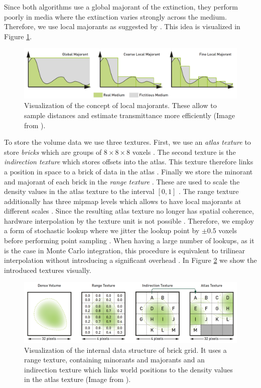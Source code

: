 Since both algorithms use a global majorant of the extinction, they perform poorly in media where the extinction varies strongly across the medium.
Therefore, we use local majorants as suggested by \citeauthor{brick_grid} \cite{brick_grid}.
This idea is visualized in Figure \ref{fig:brick_grid_majorants}.
\begin{figure}[ht]
    \centering
    \includegraphics[width=0.9\linewidth]{img/brick_grid_majorants.png}
    \caption[Visualization of local density majorants]{Visualization of the concept of local majorants. These allow to sample distances and estimate transmittance more efficiently (Image from \cite{brick_grid}).}
    \label{fig:brick_grid_majorants}
\end{figure}
To store the volume data we use three textures.
First, we use an \textit{atlas texture} to store \textit{bricks} which are groups of $8 \times 8 \times 8$ voxels \cite{brick_grid}.
The second texture is the \textit{indirection texture} which stores offsets into the atlas.
This texture therefore links a position in space to a brick of data in the atlas \cite{brick_grid}.
Finally we store the minorant and majorant of each brick in the \textit{range texture} \cite{brick_grid}.
These are used to scale the density values in the atlas texture to the interval $[0, 1]$ \cite{brick_grid}.
The range texture additionally has three mipmap levels which allows to have local majorants at different scales \cite{brick_grid}.
Since the resulting atlas texture no longer has spatial coherence, hardware interpolation by the texture unit is not possible \cite{brick_grid}.
Therefore, we employ a form of stochastic lookup where we jitter the lookup point by $\pm0.5$ voxels before performing point sampling \cite{brick_grid}.
When having a large number of lookups, as it is the case in Monte Carlo integration, this procedure is equivalent to trilinear interpolation without introducing a significant overhead \cite{brick_grid}.
In Figure \ref{fig:brick_grid_datastructure} we show the introduced textures visually.
\begin{figure}[ht]
    \centering
    \includegraphics[width=0.9\linewidth]{img/brick_grid_datastructure.png}
    \caption[Data structure of brick grid]{Visualization of the internal data structure of brick grid. It uses a range texture, containing minorants and majorants and an indirection texture which links world positions to the density values in the atlas texture (Image from \cite{brick_grid}).}
    \label{fig:brick_grid_datastructure}
\end{figure}

